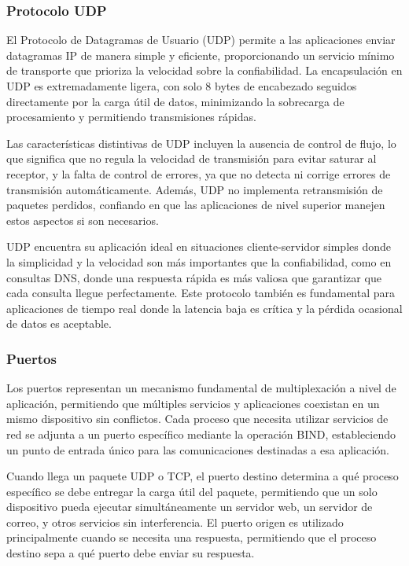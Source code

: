 \subsubsection{Protocolo UDP}

El Protocolo de Datagramas de Usuario (UDP) permite a las aplicaciones enviar datagramas IP de manera simple y eficiente, proporcionando un servicio mínimo de transporte que prioriza la velocidad sobre la confiabilidad. La encapsulación en UDP es extremadamente ligera, con solo 8 bytes de encabezado seguidos directamente por la carga útil de datos, minimizando la sobrecarga de procesamiento y permitiendo transmisiones rápidas.

Las características distintivas de UDP incluyen la ausencia de control de flujo, lo que significa que no regula la velocidad de transmisión para evitar saturar al receptor, y la falta de control de errores, ya que no detecta ni corrige errores de transmisión automáticamente. Además, UDP no implementa retransmisión de paquetes perdidos, confiando en que las aplicaciones de nivel superior manejen estos aspectos si son necesarios.

UDP encuentra su aplicación ideal en situaciones cliente-servidor simples donde la simplicidad y la velocidad son más importantes que la confiabilidad, como en consultas DNS, donde una respuesta rápida es más valiosa que garantizar que cada consulta llegue perfectamente. Este protocolo también es fundamental para aplicaciones de tiempo real donde la latencia baja es crítica y la pérdida ocasional de datos es aceptable.

\subsubsection{Puertos}

Los puertos representan un mecanismo fundamental de multiplexación a nivel de aplicación, permitiendo que múltiples servicios y aplicaciones coexistan en un mismo dispositivo sin conflictos. Cada proceso que necesita utilizar servicios de red se adjunta a un puerto específico mediante la operación BIND, estableciendo un punto de entrada único para las comunicaciones destinadas a esa aplicación.

Cuando llega un paquete UDP o TCP, el puerto destino determina a qué proceso específico se debe entregar la carga útil del paquete, permitiendo que un solo dispositivo pueda ejecutar simultáneamente un servidor web, un servidor de correo, y otros servicios sin interferencia. El puerto origen es utilizado principalmente cuando se necesita una respuesta, permitiendo que el proceso destino sepa a qué puerto debe enviar su respuesta.

